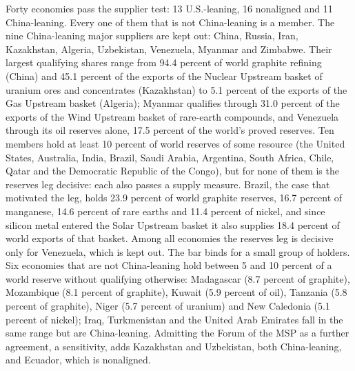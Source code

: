 Forty economies pass the supplier test: 13 U.S.-leaning, 16 nonaligned and 11 China-leaning.
Every one of them that is not China-leaning is a member. The nine China-leaning major suppliers
are kept out: China, Russia, Iran, Kazakhstan, Algeria, Uzbekistan, Venezuela, Myanmar and
Zimbabwe. Their largest qualifying shares range from 94.4 percent of world graphite refining
(China) and 45.1 percent of the exports of the Nuclear Upstream basket of uranium ores and
concentrates (Kazakhstan) to 5.1 percent of the exports of the Gas Upstream basket (Algeria);
Myanmar qualifies through 31.0 percent of the exports of the Wind Upstream basket of rare-earth
compounds, and Venezuela through its oil reserves alone, 17.5 percent of the world's proved
reserves. Ten members hold at least 10 percent of world reserves of some resource (the United
States, Australia, India, Brazil, Saudi Arabia, Argentina, South Africa, Chile, Qatar and the
Democratic Republic of the Congo), but for none of them is the reserves leg decisive: each also
passes a supply measure. Brazil, the case that motivated the leg, holds 23.9 percent of world
graphite reserves, 16.7 percent of manganese, 14.6 percent of rare earths and 11.4 percent of
nickel, and since silicon metal entered the Solar Upstream basket it also supplies 18.4 percent
of world exports of that basket. Among all economies the reserves leg is decisive only for
Venezuela, which is kept out. The bar binds for a small group of holders. Six economies that are
not China-leaning hold between 5 and 10 percent of a world reserve without qualifying otherwise:
Madagascar (8.7 percent of graphite), Mozambique (8.1 percent of graphite), Kuwait (5.9 percent of
oil), Tanzania (5.8 percent of graphite), Niger (5.7 percent of uranium) and New Caledonia (5.1
percent of nickel); Iraq, Turkmenistan and the United Arab Emirates fall in the same range but are
China-leaning. Admitting the Forum of the MSP as a further agreement, a sensitivity, adds
Kazakhstan and Uzbekistan, both China-leaning, and Ecuador, which is nonaligned.



